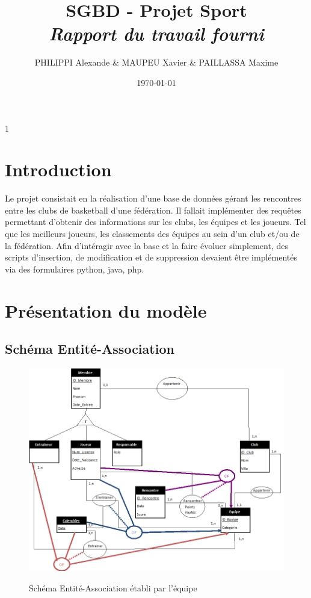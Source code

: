 1\documentclass[a4paper»,8pt,french,fleqn]{report}
\title{\textbf{SGBD - Projet Sport }\\\textit{Rapport du travail fourni}}
\author{PHILIPPI Alexande \& MAUPEU Xavier \& PAILLASSA Maxime}
\date{\today}
\begin{document}
\maketitle

\newpage

\tableofcontents

\newpage

\chapter*{Introduction}

Le projet consistait en la réalisation d'une base de données gérant les rencontres entre les clubs de basketball d'une fédération. Il fallait implémenter des requêtes permettant d'obtenir des informations sur les clubs, les équipes et les joueurs. Tel que les meilleurs joueurs, les classements des équipes au sein d'un club et/ou de la fédération. Afin d'intéragir avec la base et la faire évoluer simplement, des scripts d'insertion, de modification et de suppression devaient être implémentés via des formulaires python, java, php.

\chapter{Présentation du modèle}

\section{Schéma Entité-Association}

\begin{figure}[h]
  \centering
    \includegraphics[scale=0.7]{Schema_EA.png}
    \label{fig:schema_ea}
    \caption{Schéma Entité-Association établi par l'équipe}
\end{figure}
\end{document}
